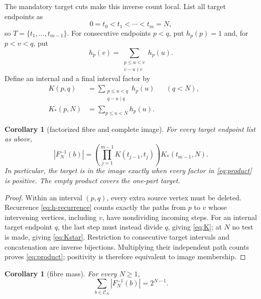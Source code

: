 \documentclass[a4paper,10pt]{amsart}
\newtheorem{corollary}[theorem]{Corollary}
\theoremstyle{remark}
\newcommand{\Comp}{\mathcal C}
\begin{document}
The mandatory target cuts make this inverse count local.  List all target
endpoints as
\begin{equation*}
 0=t_0<t_1<\cdots<t_m=N,
\end{equation*}
so $T=\{t_1,\ldots,t_{m-1}\}$.  For consecutive endpoints $p<q$, put
$h_p(p)=1$ and, for $p<v<q$, put
\begin{equation}\label{eq:h-recurrence}
 h_p(v)=\sum_{\substack{p\leq u<v\\v-u\nmid v}}h_p(u).
\end{equation}
Define an internal and a final interval factor by
\begin{align}
 K(p,q)&=\sum_{\substack{p\leq u<q\\q-u\mid q}}h_p(u)
 &&(q<N),\label{eq:K}\qquad\\[-2mm]
 K_*(p,N)&=\sum_{p\leq u<N}h_p(u).\label{eq:Kstar}
\end{align}

\begin{corollary}[factorized fibre and complete image]\label{cor:factor}
For every target endpoint list as above,
\begin{equation}\label{eq:product}
 |F_N^{-1}(b)|=
 \left(\prod_{j=1}^{m-1}K(t_{j-1},t_j)\right)
 K_*(t_{m-1},N).
\end{equation}
In particular, the target is in the image exactly when every factor in
\eqref{eq:product} is positive.  The empty product covers the one-part
target.
\end{corollary}

\begin{proof}
Within an interval $(p,q)$, every extra source vertex must be deleted.
Recurrence \eqref{eq:h-recurrence} counts exactly the paths from $p$ to $v$
whose intervening vertices, including $v$, have nondividing incoming steps.
For an internal target endpoint $q$, the last step must instead divide $q$,
giving \eqref{eq:K}; at $N$ no test is made, giving \eqref{eq:Kstar}.
Restriction to consecutive target intervals and concatenation are inverse
bijections.  Multiplying their independent path counts proves
\eqref{eq:product}; positivity is therefore equivalent to image membership.
\end{proof}

\begin{corollary}[fibre mass]\label{cor:mass}
For every $N\geq1$,
\begin{equation}\label{eq:mass}
 \sum_{b\in\Comp_N}|F_N^{-1}(b)|=2^{N-1}.
\end{equation}
\end{corollary}
\end{document}
